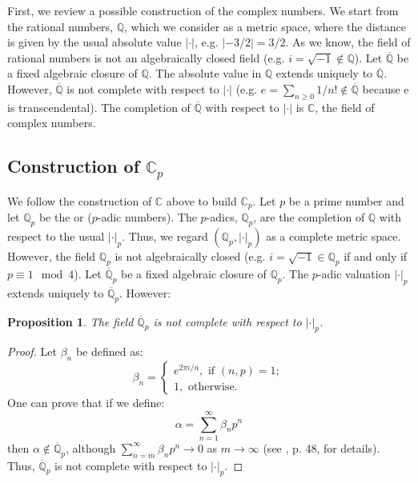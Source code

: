 \documentclass[12pt]{article}
\newtheorem*{prop}{Proposition}
\theoremstyle{definition}
\newcommand{\Complex}{\mathbb{C}}
\newcommand{\Rats}{\mathbb{Q}}
\begin{document}
First, we review a possible construction of the complex numbers. We start from the rational numbers, $\Rats$, which we consider as a metric space, where the distance is given by the usual absolute value $|\cdot|$, e.g. $|-3/2|=3/2$. As we know, the field of rational numbers is not an algebraically closed field (e.g. $i=\sqrt{-1} \notin \Rats$). Let $\overline{\Rats}$ be a fixed algebraic closure of $\Rats$. The absolute value in $\Rats$ extends uniquely to $\overline{\Rats}$. However, $\overline{\Rats}$ is not complete with respect to $|\cdot|$ (e.g. $e=\sum_{n\geq 0} 1/n!\notin \overline{\Rats}$ because e is transcendental). The completion of $\overline{\Rats}$ with respect to $|\cdot |$ is $\Complex$, the field of complex numbers. 

\subsection*{Construction of $\Complex_p$}

We follow the construction of $\Complex$ above to build $\Complex_p$. Let $p$ be a prime number and let $\Rats_p$ be the  or ($p$-adic numbers). The $p$-adics, $\Rats_p$, are the completion of $\Rats$ with respect to the usual  $|\cdot|_p$. Thus, we regard $(\Rats_p, |\cdot|_p)$ as a complete metric space. However, the field $\Rats_p$ is not algebraically closed (e.g. $i=\sqrt{-1}\in \Rats_p$ if and only if $p \equiv 1 \mod 4$). Let $\overline{\Rats}_p$ be a fixed algebraic closure of $\Rats_p$. The $p$-adic valuation $|\cdot|_p$ extends uniquely to $\overline{\Rats}_p$. However:

\begin{prop}
The field $\overline{\Rats}_p$ is not complete with respect to $|\cdot|_p$.
\end{prop}
\begin{proof}
Let $\beta_n$ be defined as:
$$\beta_n=\begin{cases}
e^{2\pi i/n}, \text{ if } (n,p)=1;\\
1 ,\text{ otherwise.}
\end{cases}$$
One can prove that if we define:
$$\alpha=\sum_{n=1}^\infty \beta_n p^n$$
then $\alpha\notin \overline{\Rats}_p$, although $\sum_{n=m}^\infty \beta_n p^n \to 0$ as $m\to \infty$ (see \cite{wash}, p. 48, for details). Thus, $\overline{\Rats}_p$ is not complete with respect to $|\cdot|_p$. 
\end{proof}
\end{document}
